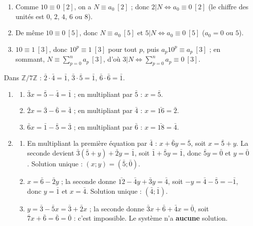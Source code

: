 \begin{corrige}
\begin{sol}
\begin{enumerate}
\item Comme $10 \equiv 0 \ [2]$, on a $N \equiv a_0 \ [2]$ ; donc $2 | N \iff a_0 \equiv 0 \ [2]$
      (le chiffre des unit\'es est $0$, $2$, $4$, $6$ ou $8$).
\item De m\^eme $10 \equiv 0 \ [5]$, donc $N \equiv a_0 \ [5]$ et $5 | N \iff a_0 \equiv 0 \ [5]$ ($a_0 = 0$ ou $5$).
\item $10 \equiv 1 \ [3]$, donc $10^p \equiv 1 \ [3]$ pour tout $p$, puis $a_p 10^p \equiv a_p \ [3]$ ;
      en sommant, $N \equiv \sum_{p=0}^n a_p \ [3]$, d'o\`u $3 | N \iff \sum_{p=0}^n a_p \equiv 0 \ [3]$.
\end{enumerate}
\end{sol}
%
\begin{sol}
Dans $\mathbb{Z}/7\mathbb{Z}$ : $\bar{2}\cdot\bar{4} = \bar{1}$, $\bar{3}\cdot\bar{5} = \bar{1}$, $\bar{6}\cdot\bar{6} = \bar{1}$.
\begin{enumerate}
\item \begin{enumerate}
      \item $\bar{3}x = \bar{5} - \bar{4} = \bar{1}$ ; en multipliant par $\bar{5}$ : $x = \bar{5}$.
      \item $\bar{2}x = \bar{3} - \bar{6} = \bar{4}$ ; en multipliant par $\bar{4}$ : $x = \bar{16} = \bar{2}$.
      \item $\bar{6}x = \bar{1} - \bar{5} = \bar{3}$ ; en multipliant par $\bar{6}$ : $x = \bar{18} = \bar{4}$.
      \end{enumerate}
\item \begin{enumerate}
      \item En multipliant la premi\`ere \'equation par $\bar{4}$ : $x + \bar{6}y = \bar{5}$, soit $x = \bar{5} + y$.
            La seconde devient $\bar{3}(\bar{5} + y) + \bar{2}y = \bar{1}$, soit $\bar{1} + \bar{5}y = \bar{1}$, donc $\bar{5} y = \bar{0}$ et $y = \bar{0}$.
            Solution unique : $(x ; y) = (\bar{5} ; \bar{0})$.
      \item $x = \bar{6} - \bar{2}y$ ; la seconde donne $\bar{12} - \bar{4}y + \bar{3}y = \bar{4}$, soit $-y = \bar{4} - \bar{5} = -\bar{1}$,
            donc $y = \bar{1}$ et $x = \bar{4}$. Solution unique : $(\bar{4} ; \bar{1})$.
      \item $y = \bar{3} - \bar{5}x = \bar{3} + \bar{2}x$ ; la seconde donne $\bar{3}x + \bar{6} + \bar{4}x = \bar{0}$, soit
            $\bar{7}x + \bar{6} = \bar{6} = \bar{0}$ : c'est impossible. Le syst\`eme n'a \textbf{aucune} solution.

\end{enumerate}
\end{enumerate}
\end{sol}
\end{corrige}
